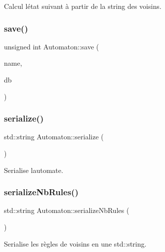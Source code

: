 Calcul l\textquotesingle{}état suivant à partir de la string des voisins. 

\mbox{\label{class_automaton_a1d4431d42cc2c71fef33c125d321b633}} 
\subsubsection{\texorpdfstring{save()}{save()}}
{\footnotesize\ttfamily unsigned int Automaton\+::save (\begin{DoxyParamCaption}\item[{const Q\+String \&}]{name,  }\item[{sqlite3 $\ast$}]{db }\end{DoxyParamCaption})}

\mbox{\label{class_automaton_a1f1af7879a469e3ad8c282d0a58a7da4}} 
\subsubsection{\texorpdfstring{serialize()}{serialize()}}
{\footnotesize\ttfamily std\+::string Automaton\+::serialize (\begin{DoxyParamCaption}{ }\end{DoxyParamCaption})\hspace{0.3cm}{\ttfamily [private]}}



Serialise l\textquotesingle{}automate. 

\mbox{\label{class_automaton_a0870a8cd719c779a822780d455e33595}} 
\subsubsection{\texorpdfstring{serialize\+Nb\+Rules()}{serializeNbRules()}}
{\footnotesize\ttfamily std\+::string Automaton\+::serialize\+Nb\+Rules (\begin{DoxyParamCaption}{ }\end{DoxyParamCaption})}



Serialise les règles de voisins en une std\+::string. 



